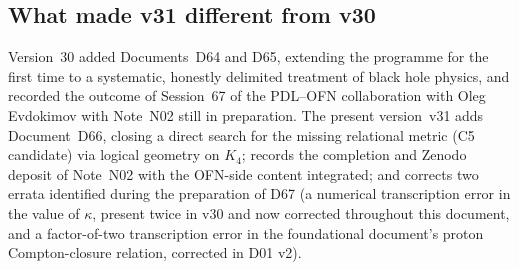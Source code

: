 \documentclass[11pt,a4paper]{article}
\theoremstyle{plain}
\theoremstyle{definition}
\theoremstyle{remark}
\begin{document}
\subsection{What made v31 different from v30}
\label{subsec:diffv30}
Version~30 added Documents~D64 and D65, extending the programme for the first time to a systematic, honestly delimited treatment of black hole physics, and recorded the outcome of Session~67 of the PDL--OFN collaboration with Oleg Evdokimov with Note~N02 still in preparation. The present version~v31 adds Document~D66, closing a direct search for the missing relational metric (C5 candidate) via logical geometry on $K_4$; records the completion and Zenodo deposit of Note~N02 with the OFN-side content integrated; and corrects two errata identified during the preparation of D67 (a numerical transcription error in the value of $\kappa$, present twice in v30 and now corrected throughout this document, and a factor-of-two transcription error in the foundational document's proton Compton-closure relation, corrected in D01 v2).
\end{document}
